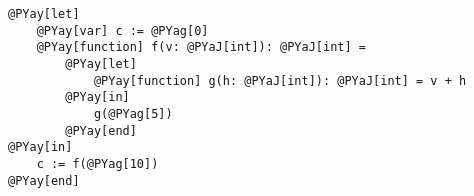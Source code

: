 \begin{Verbatim}[commandchars=@\[\]]
@PYay[let] 
    @PYay[var] c := @PYag[0]
    @PYay[function] f(v: @PYaJ[int]): @PYaJ[int] = 
        @PYay[let] 
            @PYay[function] g(h: @PYaJ[int]): @PYaJ[int] = v + h
        @PYay[in]
            g(@PYag[5])
        @PYay[end]
@PYay[in]
    c := f(@PYag[10])
@PYay[end]
\end{Verbatim}
